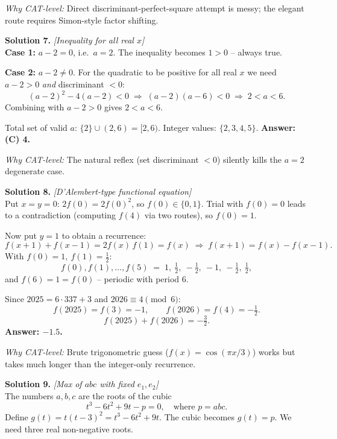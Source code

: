 \documentclass[11pt,a4paper]{article}
\begin{document}
\textit{Why CAT-level:} Direct discriminant-perfect-square attempt is messy; the elegant route requires Simon-style factor shifting.

\vspace{4pt}
\textbf{Solution 7.} \textit{[Inequality for all real $x$]}\\
\textbf{Case 1:} $a - 2 = 0$, i.e.\ $a = 2$. The inequality becomes $1 > 0$ -- always true.

\textbf{Case 2:} $a - 2 \neq 0$. For the quadratic to be positive for all real $x$ we need $a-2 > 0$ \emph{and} discriminant $< 0$:
\[
(a-2)^{2} - 4(a-2) < 0 \;\Longrightarrow\; (a-2)(a-6) < 0 \;\Longrightarrow\; 2 < a < 6.
\]
Combining with $a-2 > 0$ gives $2 < a < 6$.

Total set of valid $a$: $\{2\} \cup (2, 6) = [2, 6)$. Integer values: $\{2, 3, 4, 5\}$.
\textbf{Answer: (C) 4.}

\textit{Why CAT-level:} The natural reflex (set discriminant $< 0$) silently kills the $a = 2$ degenerate case.

\vspace{4pt}
\textbf{Solution 8.} \textit{[D'Alembert-type functional equation]}\\
Put $x = y = 0$: $2f(0) = 2f(0)^{2}$, so $f(0) \in \{0, 1\}$. Trial with $f(0) = 0$ leads to a contradiction (computing $f(4)$ via two routes), so $f(0) = 1$.

Now put $y = 1$ to obtain a recurrence:
\[
f(x+1) + f(x-1) = 2f(x)\,f(1) = f(x) \;\Longrightarrow\; f(x+1) = f(x) - f(x-1).
\]
With $f(0) = 1,\ f(1) = \tfrac{1}{2}$:
\[
f(0), f(1), \dots, f(5) \;=\; 1,\ \tfrac{1}{2},\ -\tfrac{1}{2},\ -1,\ -\tfrac{1}{2},\ \tfrac{1}{2},
\]
and $f(6) = 1 = f(0)$ -- periodic with period 6.

Since $2025 = 6 \cdot 337 + 3$ and $2026 \equiv 4 \pmod{6}$:
\[
f(2025) = f(3) = -1,\qquad f(2026) = f(4) = -\tfrac{1}{2}.
\]
\[
f(2025) + f(2026) = -\tfrac{3}{2}.
\]
\textbf{Answer: $-1.5$.}

\textit{Why CAT-level:} Brute trigonometric guess ($f(x) = \cos(\pi x/3)$) works but takes much longer than the integer-only recurrence.

\vspace{4pt}
\textbf{Solution 9.} \textit{[Max of $abc$ with fixed $e_1, e_2$]}\\
The numbers $a, b, c$ are the roots of the cubic
\[
t^{3} - 6t^{2} + 9t - p = 0, \quad \text{where } p = abc.
\]
Define $g(t) = t(t-3)^{2} = t^{3} - 6t^{2} + 9t$. The cubic becomes $g(t) = p$. We need three real non-negative roots.
\end{document}
